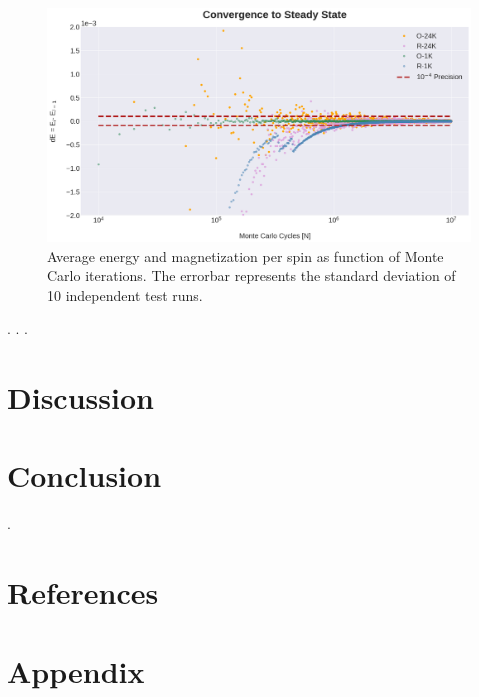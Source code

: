 \documentclass[%
reprint,nofootinbib,
amsmath,amssymb,
aps,
]{revtex4-1}
\begin{document}
\begin{figure} 
	\includegraphics[width = \textwidth]{Figures/Plot3.png} 
	\caption{\centering \label{4C1}Average energy and magnetization per spin as function of Monte Carlo iterations. The errorbar represents the standard deviation of 10 independent test runs.}
\end{figure}
\newpage.
\newpage.
\newpage.
\section{Discussion} \noindent 
\section{Conclusion} \noindent 
\newpage . \newpage
\onecolumngrid 
\section{References} \noindent
\newpage
\section{Appendix} \noindent
\end{document}
